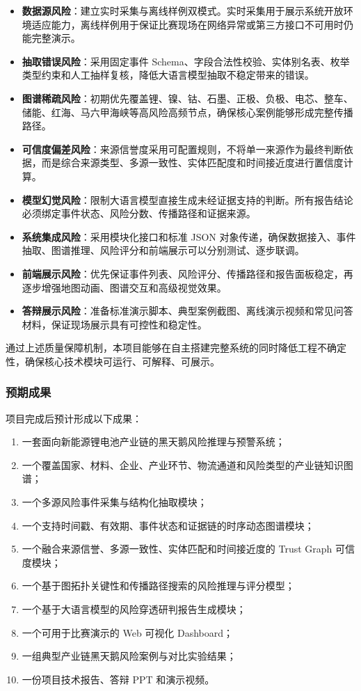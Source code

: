 \documentclass[12pt,a4paper]{article}
\newcommand{\term}[1]{\textbf{#1}}
\begin{document}
\begin{itemize}
    \item \term{数据源风险}：建立实时采集与离线样例双模式。实时采集用于展示系统开放环境适应能力，离线样例用于保证比赛现场在网络异常或第三方接口不可用时仍能完整演示。
    \item \term{抽取错误风险}：采用固定事件 Schema、字段合法性校验、实体别名表、枚举类型约束和人工抽样复核，降低大语言模型抽取不稳定带来的错误。
    \item \term{图谱稀疏风险}：初期优先覆盖锂、镍、钴、石墨、正极、负极、电芯、整车、储能、红海、马六甲海峡等高风险高频节点，确保核心案例能够形成完整传播路径。
    \item \term{可信度偏差风险}：来源信誉度采用可配置规则，不将单一来源作为最终判断依据，而是综合来源类型、多源一致性、实体匹配度和时间接近度进行置信度计算。
    \item \term{模型幻觉风险}：限制大语言模型直接生成未经证据支持的判断。所有报告结论必须绑定事件状态、风险分数、传播路径和证据来源。
    \item \term{系统集成风险}：采用模块化接口和标准 JSON 对象传递，确保数据接入、事件抽取、图谱推理、风险评分和前端展示可以分别测试、逐步联调。
    \item \term{前端展示风险}：优先保证事件列表、风险评分、传播路径和报告面板稳定，再逐步增强地图动画、图谱交互和高级视觉效果。
    \item \term{答辩展示风险}：准备标准演示脚本、典型案例截图、离线演示视频和常见问答材料，保证现场展示具有可控性和稳定性。
\end{itemize}

通过上述质量保障机制，本项目能够在自主搭建完整系统的同时降低工程不确定性，确保核心技术模块可运行、可解释、可展示。

\subsubsection{预期成果}

项目完成后预计形成以下成果：
\begin{enumerate}
    \item 一套面向新能源锂电池产业链的黑天鹅风险推理与预警系统；
    \item 一个覆盖国家、材料、企业、产业环节、物流通道和风险类型的产业链知识图谱；
    \item 一个多源风险事件采集与结构化抽取模块；
    \item 一个支持时间戳、有效期、事件状态和证据链的时序动态图谱模块；
    \item 一个融合来源信誉、多源一致性、实体匹配和时间接近度的 Trust Graph 可信度模块；
    \item 一个基于图拓扑关键性和传播路径搜索的风险推理与评分模型；
    \item 一个基于大语言模型的风险穿透研判报告生成模块；
    \item 一个可用于比赛演示的 Web 可视化 Dashboard；
    \item 一组典型产业链黑天鹅风险案例与对比实验结果；
    \item 一份项目技术报告、答辩 PPT 和演示视频。
\end{enumerate}
\end{document}
